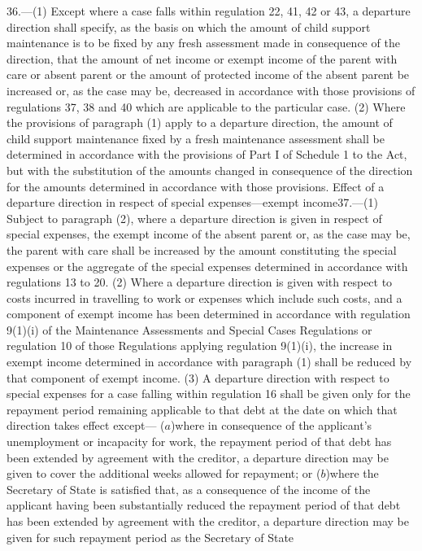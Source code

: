 \documentclass[a4paper]{article}
\begin{document}
36.—(1) Except where a case falls within regulation
22, 41, 42 or 43, a departure direction shall specify, as the basis on which the
amount of child support maintenance is to be fixed by any fresh assessment made
in consequence of the direction, that the amount of net income or exempt income
of the parent with care or absent parent or the amount of protected income of
the absent parent be increased or, as the case may be, decreased in accordance
with those provisions of regulations 37, 38 and 40 which are applicable to the
particular case.
(2) Where the provisions of paragraph (1) apply to a departure direction, the
amount of child support maintenance fixed by a fresh maintenance assessment
shall be determined in accordance with the provisions of Part I of Schedule 1 to
the Act, but with the substitution of the amounts changed in consequence of the
direction for the amounts determined in accordance with those provisions.
Effect of a departure direction in respect of special expenses—exempt
income37.—(1) Subject to paragraph (2), where a departure direction is given in
respect of special expenses, the exempt income of the absent parent or, as the
case may be, the parent with care shall be increased by the amount constituting
the special expenses or the aggregate of the special expenses determined in
accordance with regulations 13 to 20.
(2) Where a departure direction is given with respect to costs incurred in
travelling to work or expenses which include such costs, and a component of
exempt income has been determined in accordance with regulation 9(1)(i) of the
Maintenance Assessments and Special Cases Regulations or regulation 10 of those
Regulations applying regulation 9(1)(i), the increase in exempt income
determined in accordance with paragraph (1) shall be reduced by that component
of exempt income.
(3) A departure direction with respect to special expenses for a case falling
within regulation 16 shall be given only for the repayment period remaining
applicable to that debt at the date on which that direction takes effect except—
($a$)where in consequence of the applicant’s unemployment or incapacity for work,
the repayment period of that debt has been extended by agreement with the
creditor, a departure direction may be given to cover the additional weeks
allowed for repayment; or
($b$)where the Secretary of State is satisfied that, as a consequence of the
income of the applicant having been substantially reduced the repayment period
of that debt has been extended by agreement with the creditor, a departure
direction may be given for such repayment period as the Secretary of State
\end{document}
